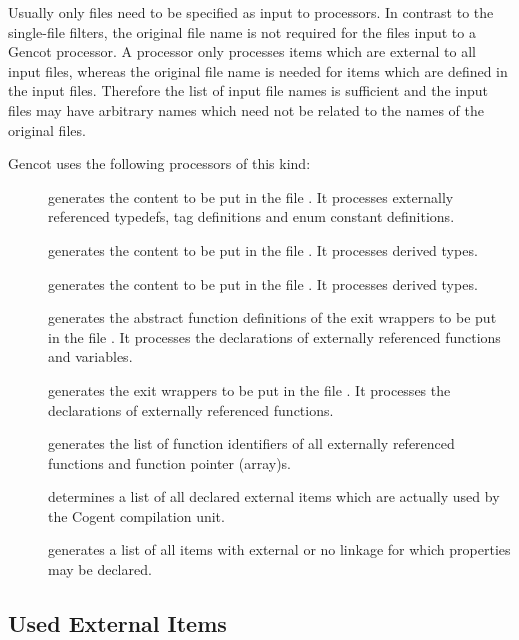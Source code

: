 Usually only  files need to be specified as input to processors.
In contrast to the single-file filters, the original file name is not required for the files input to a 
Gencot processor. A processor only processes items which are external to all input files, whereas the original
file name is needed for items which are defined in the input files. Therefore the list of input file names is
sufficient and the input files may have arbitrary names which need not be related to the names of the original 
 files.

Gencot uses the following processors of this kind:
\begin{description}
\item[] generates the content to be put in the file . It 
processes externally referenced typedefs, tag definitions and enum constant definitions.
\item[] generates the content to be put in the file . It 
processes derived types.
\item[] generates the content to be put in the file . It 
processes derived types.
\item[] generates the abstract function definitions of the exit wrappers to be put in the file 
. It processes the declarations of externally referenced functions and variables.
\item[] generates the exit wrappers to be put in the file . It processes
the declarations of externally referenced functions.
\item[] generates the list of function identifiers of all externally referenced functions and
function pointer (array)s.
\item[] determines a list of all declared external items which are actually used by the Cogent
compilation unit.
\item[] generates a list of all items with external or no linkage 
for which properties may be declared.
\end{description}

\subsection{Used External Items}
\label{impl-ccomps-items}

